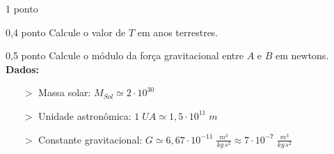 \documentclass{../lista}
\begin{document}
\begin{questao}{1 ponto}
		\begin{pergunta}{0,4 ponto}
			Calcule o valor de $T$ em anos terrestres.
			
			\espacoCalculo[7cm]
			\espacoRespostaPergunta
		\end{pergunta}

		\begin{pergunta}{0,5 ponto}
			Calcule o módulo da força gravitacional entre $A$ e $B$ em newtons. \\
			\textbf{Dados:}
				\begin{itemize}
					\item[$>$] Massa solar: $M_{Sol} \simeq 2 \cdot 10^{30}$
					\item[$>$] Unidade astronômica: $1 \; UA \simeq 1,5 \cdot 10^{11} \; m$
					\item[$>$] Constante gravitacional: $G \simeq 6,67 \cdot 10^{-11} \; \frac{m^3}{kg \, s^2} \approx 7 \cdot 10^{-7} \; \frac{m^3}{kg \, s^2}$
				\end{itemize}
			
			\espacoCalculo[7cm]
			\espacoRespostaPergunta
		\end{pergunta}
	\end{questao}
	
	\encerramento
\end{document}
